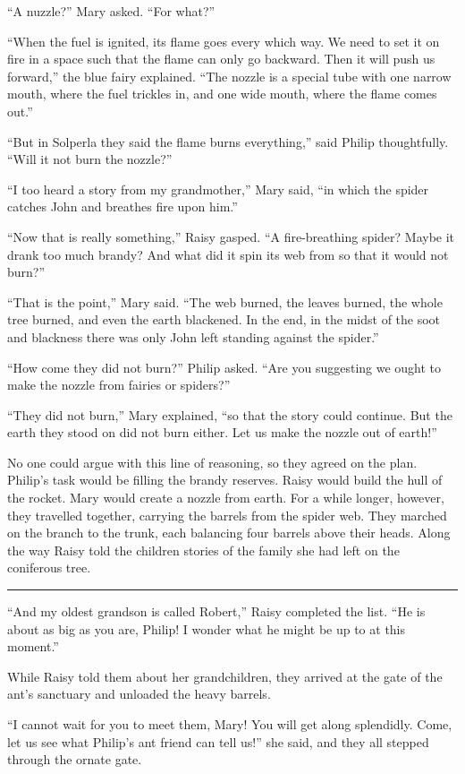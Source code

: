 \documentclass[10pt]{memoir}
\renewcommand{\pfbreakdisplay}{\bigskip \ding{166} \bigskip}
\newcommand{\secbreak}{\fancybreak{\pfbreakdisplay}}
\begin{document}
``A nuzzle?'' Mary asked. ``For what?''

``When the fuel is ignited, its flame goes every which way. We need to set it
on fire in a space such that the flame can only go backward. Then it will push
us forward,'' the blue fairy explained. ``The nozzle is a special tube with one
narrow mouth, where the fuel trickles in, and one wide mouth, where the flame
comes out.''

``But in Solperla they said the flame burns everything,'' said Philip
thoughtfully. ``Will it not burn the nozzle?''

``I too heard a story from my grandmother,'' Mary said, ``in which the spider
catches John and breathes fire upon him.''

``Now that is really something,'' Raisy gasped. ``A fire-breathing spider?
Maybe it drank too much brandy? And what did it spin its web from so that it
would not burn?''

``That is the point,'' Mary said. ``The web burned, the leaves burned, the
whole tree burned, and even the earth blackened. In the end, in the midst of
the soot and blackness there was only John left standing against the spider.''

``How come they did not burn?'' Philip asked. ``Are you suggesting we ought to
make the nozzle from fairies or spiders?''

``They did not burn,'' Mary explained, ``so that the story could continue. But
the earth they stood on did not burn either. Let us make the nozzle out of
earth!''

No one could argue with this line of reasoning, so they agreed on the plan.
Philip's task would be filling the brandy reserves. Raisy would build the hull
of the rocket. Mary would create a nozzle from earth. For a while longer,
however, they travelled together, carrying the barrels from the spider web.
They marched on the branch to the trunk, each balancing four barrels above
their heads. Along the way Raisy told the children stories of the family she
had left on the coniferous tree.

\secbreak

``And my oldest grandson is called Robert,'' Raisy completed the list. ``He is
about as big as you are, Philip! I wonder what he might be up to at this
moment.''

While Raisy told them about her grandchildren, they arrived at the gate of the
ant's sanctuary and unloaded the heavy barrels.

``I cannot wait for you to meet them, Mary! You will get along splendidly.
Come, let us see what Philip's ant friend can tell us!'' she said, and they all
stepped through the ornate gate.
\end{document}
